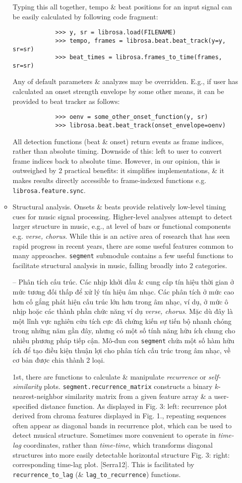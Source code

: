 \documentclass{article}
\begin{document}
\begin{itemize}
\begin{itemize}
		Typing this all together, tempo \& beat positions for an input signal can be easily calculated by following code fragment:
		\begin{verbatim}
			>>> y, sr = librosa.load(FILENAME)
			>>> tempo, frames = librosa.beat.beat_track(y=y, sr=sr)
			>>> beat_times = librosa.frames_to_time(frames, sr=sr)
		\end{verbatim}
		Any of default parameters \& analyzes may be overridden. E.g., if user has calculated an onset strength envelope by some other means, it can be provided to beat tracker as follows:
		\begin{verbatim}
			>>> oenv = some_other_onset_function(y, sr)
			>>> librosa.beat.beat_track(onset_envelope=oenv)
		\end{verbatim}
		All detection functions (beat \& onset) return events as frame indices, rather than absolute timing. Downside of this: left to user to convert frame indices back to absolute time. However, in our opinion, this is outweighed by 2 practical benefits: it simplifies implementations, \& it makes results directly accessible to frame-indexed functions e.g. {\tt librosa.feature.sync}.
		\item {\sf Structural analysis.} Onsets \& beats provide relatively low-level timing cues for music signal processing. Higher-level analyses attempt to detect larger structure in music, e.g., at level of bars or functional components e.g. {\it verse, chorus}. While this is an active area of research that has seen rapid progress in recent years, there are some useful features common to many approaches. {\tt segment} submodule contains a few useful functions to facilitate structural analysis in music, falling broadly into 2 categories.
		
		-- {\sf Phân tích cấu trúc.} Các nhịp khởi đầu \& cung cấp tín hiệu thời gian ở mức tương đối thấp để xử lý tín hiệu âm nhạc. Các phân tích ở mức cao hơn cố gắng phát hiện cấu trúc lớn hơn trong âm nhạc, ví dụ, ở mức ô nhịp hoặc các thành phần chức năng ví dụ {\it verse, chorus}. Mặc dù đây là một lĩnh vực nghiên cứu tích cực đã chứng kiến sự tiến bộ nhanh chóng trong những năm gần đây, nhưng có một số tính năng hữu ích chung cho nhiều phương pháp tiếp cận. Mô-đun con {\tt segment} chứa một số hàm hữu ích để tạo điều kiện thuận lợi cho phân tích cấu trúc trong âm nhạc, về cơ bản được chia thành 2 loại.
		
		1st, there are functions to calculate \& manipulate {\it recurrence} or {\it self-similarity} plots. \verb|segment.recurrence_matrix| constructs a binary $k$-nearest-neighbor similarity matrix from a given feature array \& a user-specified distance function. As displayed in {\sf Fig. 3: left: recurrence plot derived from chroma features displayed in Fig. 1.}, repeating sequences often appear as diagonal bands in recurrence plot, which can be used to detect musical structure. Sometimes more convenient to operate in {\it time-lag} coordinates, rather than {\it time-time}, which transforms diagonal structures into more easily detectable horizontal structure {\sf Fig. 3: right: corresponding time-lag plot.} [Serra12]. This is facilitated by \verb|recurrence_to_lag| (\& \verb|lag_to_recurrence|) functions.
		

\end{itemize}
\end{itemize}
\end{document}
